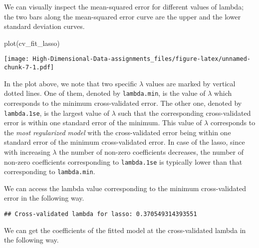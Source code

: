 \documentclass[
]{book}
\newenvironment{Shaded}{\begin{snugshade}}{\end{snugshade}}
\newcommand{\FunctionTok}[1]{\textcolor[rgb]{0.00,0.00,0.00}{#1}}
\newcommand{\NormalTok}[1]{#1}
\newcommand{\OtherTok}[1]{\textcolor[rgb]{0.56,0.35,0.01}{#1}}
\newcommand{\SpecialCharTok}[1]{\textcolor[rgb]{0.00,0.00,0.00}{#1}}
\newcommand{\StringTok}[1]{\textcolor[rgb]{0.31,0.60,0.02}{#1}}
\begin{document}
We can visually inspect the mean-squared error for different values of lambda; the two bars along the mean-squared error curve are the upper and the lower standard deviation curves.

\begin{Shaded}
\begin{Highlighting}[]
\FunctionTok{plot}\NormalTok{(cv\_fit\_lasso)}
\end{Highlighting}
\end{Shaded}

\texttt{[image: High-Dimensional-Data-assignments\_files/figure-latex/unnamed-chunk-7-1.pdf]}

In the plot above, we note that two specific \(\lambda\) values are marked by vertical dotted lines. One of them, denoted by \texttt{lambda.min}, is the value of \(\lambda\) which corresponds to the minimum cross-validated error. The other one, denoted by \texttt{lambda.1se}, is the largest value of \(\lambda\) such that the corresponding cross-validated error is within one standard error of the minimum. This value of \(\lambda\) corresponds to the \emph{most regularized model} with the cross-validated error being within one standard error of the minimum cross-validated error. In case of the lasso, since with increasing \(\lambda\) the number of non-zero coefficients decreases, the number of non-zero coefficients corresponding to \texttt{lambda.1se} is typically lower than that corresponding to \texttt{lambda.min}.

We can access the lambda value corresponding to the minimum cross-validated error in the following way.

\begin{Shaded}
\end{Shaded}

\begin{verbatim}
## Cross-validated lambda for lasso: 0.370549314393551
\end{verbatim}

We can get the coefficients of the fitted model at the cross-validated lambda in the following way.
\end{document}
